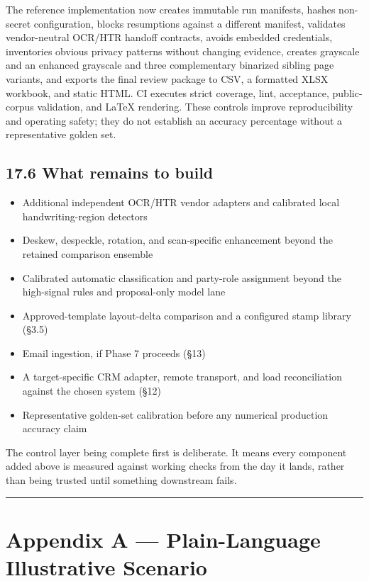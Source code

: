 \documentclass[
]{article}
\providecommand{\tightlist}{%
  \setlength{\itemsep}{0pt}\setlength{\parskip}{0pt}}
\begin{document}
The reference implementation now creates immutable run manifests, hashes
non-secret configuration, blocks resumptions against a different
manifest, validates vendor-neutral OCR/HTR handoff contracts, avoids
embedded credentials, inventories obvious privacy patterns without
changing evidence, creates grayscale and an enhanced grayscale and three
complementary binarized sibling page variants, and exports the final
review package to CSV, a formatted XLSX workbook, and static HTML. CI
executes strict coverage, lint, acceptance, public-corpus validation,
and LaTeX rendering. These controls improve reproducibility and
operating safety; they do not establish an accuracy percentage without a
representative golden set.

\subsection{17.6 What remains to build}\label{what-remains-to-build}

\begin{itemize}
\tightlist
\item
  Additional independent OCR/HTR vendor adapters and calibrated local
  handwriting-region detectors
\item
  Deskew, despeckle, rotation, and scan-specific enhancement beyond the
  retained comparison ensemble
\item
  Calibrated automatic classification and party-role assignment beyond
  the high-signal rules and proposal-only model lane
\item
  Approved-template layout-delta comparison and a configured stamp
  library (§3.5)
\item
  Email ingestion, if Phase 7 proceeds (§13)
\item
  A target-specific CRM adapter, remote transport, and load
  reconciliation against the chosen system (§12)
\item
  Representative golden-set calibration before any numerical production
  accuracy claim
\end{itemize}

The control layer being complete first is deliberate. It means every
component added above is measured against working checks from the day it
lands, rather than being trusted until something downstream fails.

\begin{center}\rule{0.5\linewidth}{0.5pt}\end{center}

\section{Appendix A --- Plain-Language Illustrative
Scenario}\label{appendix-a-plain-language-illustrative-scenario}
\end{document}
